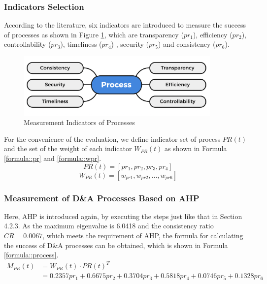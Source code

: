 \documentclass{mcmthesis}
\begin{document}
\subsubsection{Indicators Selection}
According to the literature, six indicators are introduced to measure the success of processes as shown in Figure \ref{figure::Measurement Indicators of Processes}, which are transparency ($pr_1$), efficiency ($pr_2$), controllability ($pr_3$), timeliness ($pr_4$) , security ($pr_5$) and consistency ($pr_6$).

\begin{figure}[!htbp]
    \small
    \centering
    \includegraphics[width=10cm]{figures/IndicatorsofProcess.png}
    \caption{Measurement Indicators of Processes} 
    \label{figure::Measurement Indicators of Processes}
\end{figure}%

For the convenience of the evaluation, we define indicator set of process $PR(t)$ and the set of the weight of each indicator $W_{PR}(t)$ as shown in Formula \ref{formula::pr} and \ref{formula::wpr}.
\begin{equation}
    PR(t) = [pr_1,pr_2,pr_3,pr_4]
    \label{formula::pr}
\end{equation}
\begin{equation}
    W_{PR}(t) = [w_{pr1},w_{pr2}, \dots ,w_{pr6}]
    \label{formula::wpr}
\end{equation}

\subsubsection{Measurement of D\&A Processes Based on AHP}
Here, AHP is introduced again, by executing the steps just like that in Section 4.2.3. As the maximum eigenvalue is 6.0418 and the consistency ratio  $CR = 0.0067$, which meets the requirement of AHP, the formula for calculating the success of D\&A processes can be obtained, which is shown in Formula \ref{formula::process}.
\begin{equation}
    \begin{split}
    M_{PR}(t) &= W_{PR}(t) \cdot PR(t)^T \\
              &= 0.2357pr_1+0.6675pr_2+0.3704pr_3+0.5818pr_4+0.0746pr_5+0.1328pr_6
    \end{split}
    \label{formula::process}
\end{equation}
\end{document}
